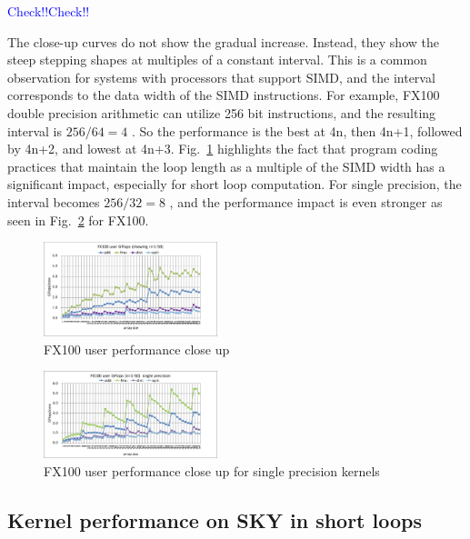 \documentclass[conference]{IEEEtran}
\begin{document}
{\textcolor{blue}{Check!!Check!!}}

The close-up curves do not show the gradual increase. Instead, they
show the steep stepping shapes at multiples of a constant interval.
This is a common observation for systems with processors that support SIMD,
and the interval corresponds to the data width of the SIMD instructions.
For example, FX100 double precision arithmetic can utilize
256 bit instructions, and the resulting interval is
\begin{math}
256 / 64 = 4
\end{math}
.
So the performance is the best at 4n, then 4n+1, followed by 4n+2,
and lowest at 4n+3.
Fig.~\ref{fig:fx100-gflops-short-R8} highlights the fact that
program coding practices that maintain the loop length as a multiple of
the SIMD width has a significant impact, especially for short loop computation.
For single precision, the interval becomes
\begin{math}
256 / 32 = 8
\end{math}
, and the performance impact is even stronger as seen in
Fig.~\ref{fig:fx100-gflops-short-R4} for FX100.

\begin{figure}[tb]
\centering
\includegraphics[width=0.45\textwidth]{figs/fx100-gflops-short-R8.pdf}
\caption{FX100 user performance close up}
\label{fig:fx100-gflops-short-R8}
\end{figure}

\begin{figure}[tb]
\centering
\includegraphics[width=0.45\textwidth]{figs/fx100-gflops-short-R4.pdf}
\caption{FX100 user performance close up for single precision kernels}
\label{fig:fx100-gflops-short-R4}
\end{figure}

\subsection{Kernel performance on SKY in short loops}
\label{subsection:short-kernels-sky}
\end{document}
